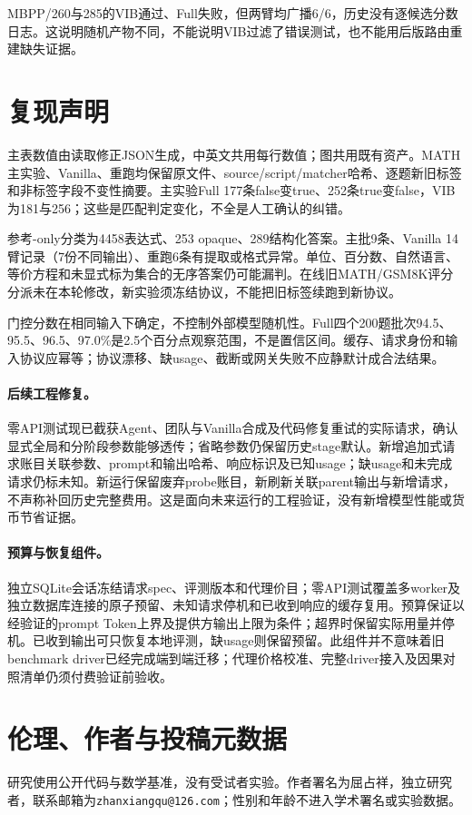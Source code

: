\documentclass[11pt,a4paper]{article}
\begin{document}
MBPP/260与285的VIB通过、Full失败，但两臂均广播6/6，历史没有逐候选分数日志。这说明随机产物不同，不能说明VIB过滤了错误测试，也不能用后版路由重建缺失证据。

\section{复现声明}\label{app:repro}
主表数值由读取修正JSON生成，中英文共用每行数值；图共用既有资产。MATH主实验、Vanilla、重跑均保留原文件、source/script/matcher哈希、逐题新旧标签和非标签字段不变性摘要。主实验Full 177条false变true、252条true变false，VIB为181与256；这些是匹配判定变化，不全是人工确认的纠错。

参考-only分类为4458表达式、253 opaque、289结构化答案。主批9条、Vanilla 14臂记录（7份不同输出）、重跑6条有提取或格式异常。单位、百分数、自然语言、等价方程和未显式标为集合的无序答案仍可能漏判。在线旧MATH/GSM8K评分分派未在本轮修改，新实验须冻结协议，不能把旧标签续跑到新协议。

门控分数在相同输入下确定，不控制外部模型随机性。Full四个200题批次94.5、95.5、96.5、97.0\%是2.5个百分点观察范围，不是置信区间。缓存、请求身份和输入协议应幂等；协议漂移、缺usage、截断或网关失败不应静默计成合法结果。

\paragraph{后续工程修复。}
零API测试现已截获Agent、团队与Vanilla合成及代码修复重试的实际请求，确认显式全局和分阶段参数能够透传；省略参数仍保留历史stage默认。新增追加式请求账目关联参数、prompt和输出哈希、响应标识及已知usage；缺usage和未完成请求仍标未知。新运行保留废弃probe账目，新刷新关联parent输出与新增请求，不声称补回历史完整费用。这是面向未来运行的工程验证，没有新增模型性能或货币节省证据。

\paragraph{预算与恢复组件。}
独立SQLite会话冻结请求spec、评测版本和代理价目；零API测试覆盖多worker及独立数据库连接的原子预留、未知请求停机和已收到响应的缓存复用。预算保证以经验证的prompt Token上界及提供方输出上限为条件；超界时保留实际用量并停机。已收到输出可只恢复本地评测，缺usage则保留预留。此组件并不意味着旧benchmark driver已经完成端到端迁移；代理价格校准、完整driver接入及因果对照清单仍须付费验证前验收。

\section{伦理、作者与投稿元数据}\label{app:ethics}
研究使用公开代码与数学基准，没有受试者实验。作者署名为屈占祥，独立研究者，联系邮箱为\texttt{zhanxiangqu@126.com}；性别和年龄不进入学术署名或实验数据。
\end{document}
